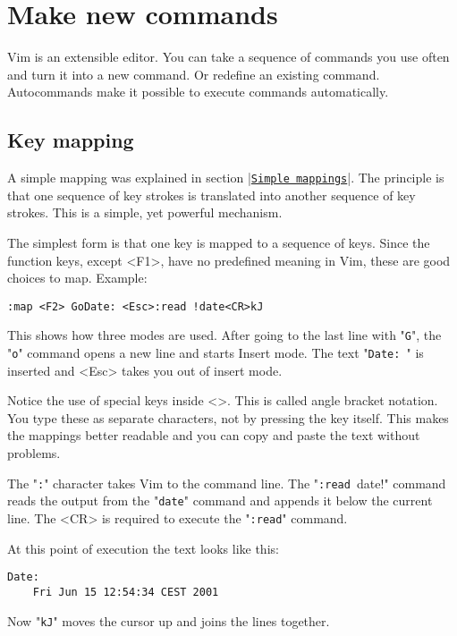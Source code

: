 \section{Make new commands}
Vim is an extensible editor.
You can take a sequence of commands you use often and turn it into a new command.
Or redefine an existing command.
Autocommands make it possible to execute commands automatically.
\subsection{Key mapping}
\label{Key mapping}
A simple mapping was explained in section |\hyperref[Simple mappings]{\texttt{Simple mappings}}|.
The principle is that one sequence of key strokes is translated into another sequence of key strokes.
This is a simple, yet powerful mechanism.

The simplest form is that one key is mapped to a sequence of keys.
Since the function keys, except <F1>, have no predefined meaning in Vim, these are good choices to map.
Example:

\begin{Verbatim}[samepage=true]
 :map <F2> GoDate: <Esc>:read !date<CR>kJ
\end{Verbatim}

This shows how three modes are used.
After going to the last line with "\verb!G!", the "\verb!o!" command opens a new line and starts Insert mode.
The text "\verb!Date: !" is inserted and <Esc> takes you out of insert mode.

Notice the use of special keys inside <>.
This is called angle bracket notation.
You type these as separate characters, not by pressing the key itself.
This makes the mappings better readable and you can copy and paste the text without problems.

The "\verb!:!" character takes Vim to the command line.
The "\verb!:read !date!" command reads the output from the "\verb!date!" command and appends it below the current line.
The <CR> is required to execute the "\verb!:read!" command.

At this point of execution the text looks like this:

\begin{Verbatim}[samepage=true]
    Date:  
    Fri Jun 15 12:54:34 CEST 2001 
\end{Verbatim}

Now "\verb!kJ!" moves the cursor up and joins the lines together.

